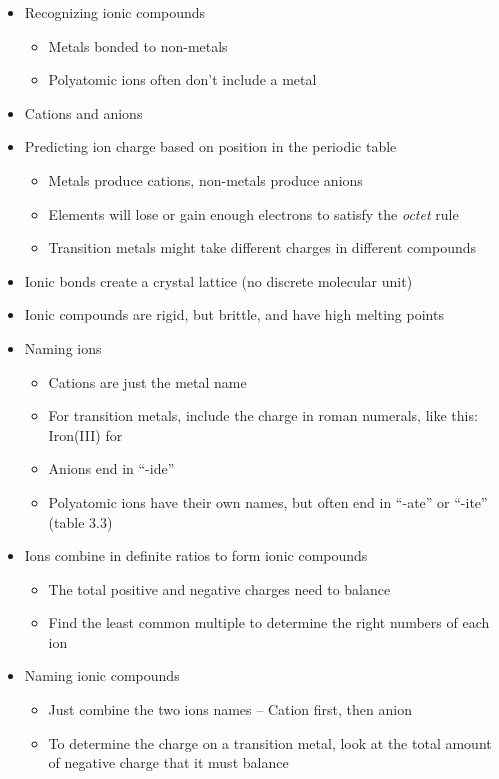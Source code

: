 \documentclass[12pt, letterpaper]{memoir}
\begin{document}
	\begin{itemize}
		\item Recognizing ionic compounds
		\begin{itemize}
			\item Metals bonded to non-metals
			\item Polyatomic ions often don't include a metal
		\end{itemize}
		\item Cations and anions
		\item Predicting ion charge based on position in the periodic table
		\begin{itemize}
			\item Metals produce cations, non-metals produce anions
			\item Elements will lose or gain enough electrons to satisfy the \emph{octet} rule
			\item Transition metals might take different charges in different compounds
		\end{itemize}
		\item Ionic bonds create a crystal lattice (no discrete molecular unit)
		\item Ionic compounds are rigid, but brittle, and have high melting points
		\item Naming ions
		\begin{itemize}
			\item Cations are just the metal name
			\item For transition metals, include the charge in roman numerals, like this: Iron(III) for 
			\item Anions end in ``-ide''
			\item Polyatomic ions have their own names, but often end in ``-ate'' or ``-ite'' (table 3.3)
		\end{itemize}
		\item Ions combine in definite ratios to form ionic compounds
		\begin{itemize}
			\item The total positive and negative charges need to balance
			\item Find the least common multiple to determine the right numbers of each ion
		\end{itemize}
		\item Naming ionic compounds
		\begin{itemize}
			\item Just combine the two ions names -- Cation first, then anion
			\item To determine the charge on a transition metal, look at the total amount of negative charge that it must balance
		\end{itemize}
	\end{itemize}
	
\end{document}
